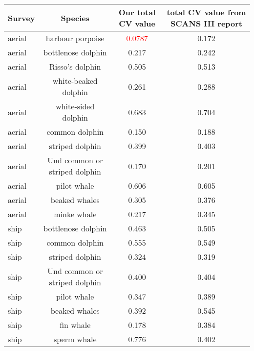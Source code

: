 \documentclass[
]{article}
\begin{document}
\begin{longtable}[]{@{}lccc@{}}
\toprule
Survey & Species & Our total CV value & total CV value from SCANS III
report\tabularnewline
\midrule
\endhead
aerial & harbour porpoise & \textcolor{red}{0.0787} &
0.172\tabularnewline
aerial & bottlenose dolphin & 0.217 & 0.242\tabularnewline
aerial & Risso's dolphin & 0.505 & 0.513\tabularnewline
aerial & white-beaked dolphin & 0.261 & 0.288\tabularnewline
aerial & white-sided dolphin & 0.683 & 0.704\tabularnewline
aerial & common dolphin & 0.150 & 0.188\tabularnewline
aerial & striped dolphin & 0.399 & 0.403\tabularnewline
aerial & Und common or striped dolphin & 0.170 & 0.201\tabularnewline
aerial & pilot whale & 0.606 & 0.605\tabularnewline
aerial & beaked whales & 0.305 & 0.376\tabularnewline
aerial & minke whale & 0.217 & 0.345\tabularnewline
ship & bottlenose dolphin & 0.463 & 0.505\tabularnewline
ship & common dolphin & 0.555 & 0.549\tabularnewline
ship & striped dolphin & 0.324 & 0.319\tabularnewline
ship & Und common or striped dolphin & 0.400 & 0.404\tabularnewline
ship & pilot whale & 0.347 & 0.389\tabularnewline
ship & beaked whales & 0.392 & 0.545\tabularnewline
ship & fin whale & 0.178 & 0.384\tabularnewline
ship & sperm whale & 0.776 & 0.402\tabularnewline
\bottomrule
\end{longtable}
\end{document}
